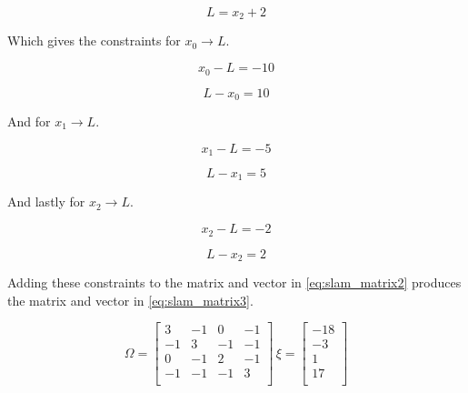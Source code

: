 \begin{equation}
\label{eq:slam_lan_rel3}
L = x_2 + 2
\end{equation}

Which gives the constraints for $x_0 \rightarrow L$.

\begin{equation}
\label{eq:slam_lan_cons1_a}
x_0 - L = -10
\end{equation}

\begin{equation}
\label{eq:slam_lan_cons1_b}
L - x_0 = 10
\end{equation}

And for $x_1 \rightarrow L$.

\begin{equation}
\label{eq:slam_lan_cons2_a}
x_1 - L = -5
\end{equation}

\begin{equation}
\label{eq:slam_lan_cons2_b}
L - x_1 = 5
\end{equation}

And lastly for $x_2 \rightarrow L$.

\begin{equation}
\label{eq:slam_lan_cons3_a}
x_2 - L = -2
\end{equation}

\begin{equation}
\label{eq:slam_lan_cons3_b}
L - x_2 = 2
\end{equation}

Adding these constraints to the matrix and vector in \autoref{eq:slam_matrix2} produces the matrix and vector in \autoref{eq:slam_matrix3}.

\begin{equation}
\Omega =
\label{eq:slam_matrix3}
\begin{bmatrix}
3 & -1 & 0 & -1 \\
-1 & 3 & -1 & -1 \\
0 & -1 & 2 & -1 \\
-1 & -1 & -1 & 3 \\
\end{bmatrix}\,
\xi =
\begin{bmatrix}
-18 \\
-3 \\
1 \\
17 \\
\end{bmatrix}
\end{equation}


